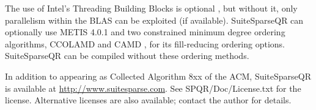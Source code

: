 \documentclass[12pt]{article}
\begin{document}
The use of Intel's Threading Building Blocks is optional \cite{Reinders07}, but
without it, only parallelism within the BLAS can be exploited (if available).
Suite\-SparseQR can optionally use METIS 4.0.1 \cite{KarypisKumar98e} and two
constrained minimum degree ordering algorithms, CCOLAMD and CAMD
\cite{ChenDavisHagerRajamanickam09}, for its fill-reducing ordering options.
SuiteSparseQR can be compiled without these ordering methods.

In addition to appearing as Collected Algorithm 8xx of the ACM, SuiteSparseQR
is available at
\url{http://www.suitesparse.com}.
See SPQR/Doc/License.txt for the license.
Alternative licenses are also
available; contact the author for details.




\end{document}
